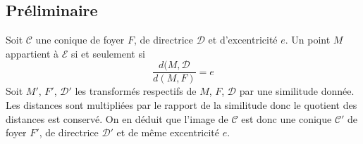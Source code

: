 \subsection*{Préliminaire}
Soit $\mathcal C$ une conique de foyer $F$, de directrice $\mathcal D$ et d'excentricité $e$. Un point $M$ appartient à $\mathcal E$ si et seulement si
\begin{displaymath}
 \dfrac{d(M,\mathcal D}{d(M,F)} = e 
\end{displaymath}
Soit $M'$, $F'$, $\mathcal D'$ les transformés respectifs de $M$, $F$, $\mathcal D$ par une similitude donnée. Les distances sont multipliées par le rapport de la similitude donc le quotient des distances est conservé. On en déduit que l'image de $\mathcal C$ est donc une conique $\mathcal C'$ de foyer $F'$, de directrice $\mathcal D'$ et de même excentricité $e$.

